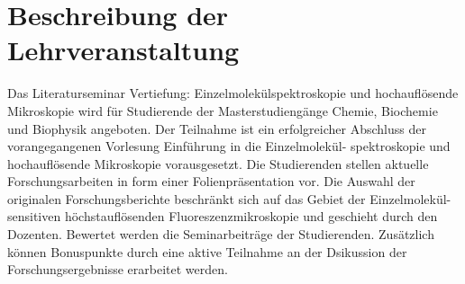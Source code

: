 \section{Beschreibung der Lehrveranstaltung}
Das Literaturseminar Vertiefung: Einzelmolekülspektroskopie und hochauflösende Mikroskopie wird für Studierende der Masterstudiengänge Chemie, Biochemie und Biophysik angeboten. Der Teilnahme ist ein erfolgreicher Abschluss der vorangegangenen Vorlesung Einführung in die Einzelmolekül-
spektroskopie und hochauflösende Mikroskopie vorausgesetzt. Die Studierenden stellen aktuelle Forschungsarbeiten in form einer Folienpräsentation vor. Die Auswahl der originalen Forschungsberichte beschränkt sich auf das Gebiet der Einzelmolekül-sensitiven höchstauflösenden Fluoreszenzmikroskopie und geschieht durch den Dozenten. Bewertet werden die Seminarbeiträge der Studierenden. Zusätzlich können Bonuspunkte durch eine aktive Teilnahme an der Dsikussion der Forschungsergebnisse erarbeitet werden.



